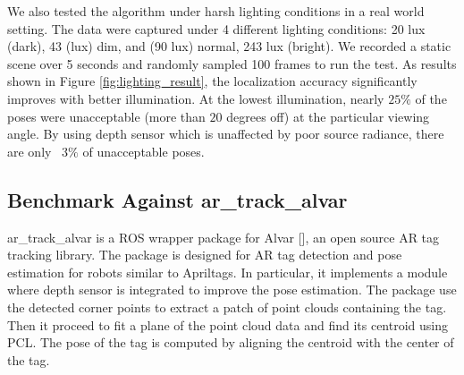 We also tested the algorithm under harsh lighting conditions in a real world setting. The data were captured under 4 different lighting conditions: 20 lux (dark), 43 (lux) dim, and (90 lux) normal, 243 lux (bright). We recorded a static scene over 5 seconds and randomly sampled 100 frames to run the test.  As results shown in Figure \ref{fig:lighting_result}, the localization accuracy significantly improves with better illumination. At the lowest illumination, nearly $25\%$ of the poses were unacceptable (more than $20$ degrees off) at the particular viewing angle. By using depth sensor which is unaffected by poor source radiance, there are only ~$3\%$ of unacceptable poses.

\subsection{Benchmark Against ar\_track\_alvar}
ar\_track\_alvar is a ROS wrapper package for Alvar [], an open source AR tag tracking library. The package is designed for AR tag detection and pose estimation for robots similar to Apriltags. In particular, it implements a module where depth sensor is integrated to improve the pose estimation. The package use the detected corner points to extract a patch of point clouds containing the tag. Then it proceed to fit a plane of the point cloud data and find its centroid using PCL. The pose of the tag is computed by aligning the centroid with the center of the tag.   

